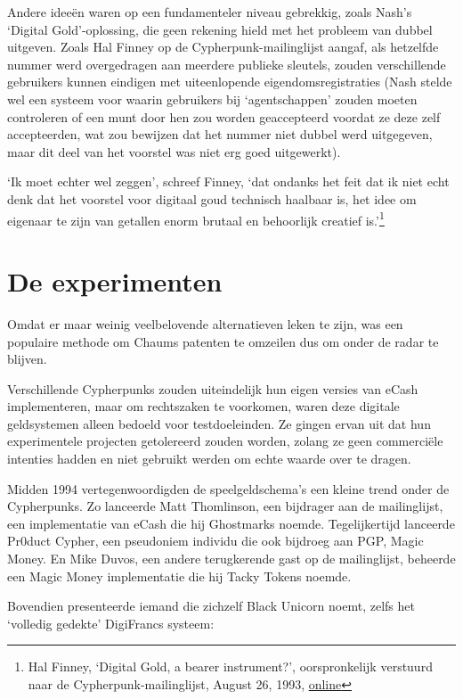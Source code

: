 \documentclass[
  a5paper,
  smalldemyvopaper,11pt,twoside,onecolumn,openright,extrafontsizes,
hidelinks]{memoir}
\begin{document}
Andere ideeën waren op een fundamenteler niveau gebrekkig, zoals Nash's
`Digital Gold'-oplossing, die geen rekening hield met het probleem van
dubbel uitgeven. Zoals Hal Finney op de Cypherpunk-mailinglijst aangaf,
als hetzelfde nummer werd overgedragen aan meerdere publieke sleutels,
zouden verschillende gebruikers kunnen eindigen met uiteenlopende
eigendomsregistraties (Nash stelde wel een systeem voor waarin
gebruikers bij `agentschappen' zouden moeten controleren of een munt
door hen zou worden geaccepteerd voordat ze deze zelf accepteerden, wat
zou bewijzen dat het nummer niet dubbel werd uitgegeven, maar dit deel
van het voorstel was niet erg goed uitgewerkt).

`Ik moet echter wel zeggen', schreef Finney, `dat ondanks het feit dat
ik niet echt denk dat het voorstel voor digitaal goud technisch haalbaar
is, het idee om eigenaar te zijn van getallen enorm brutaal en
behoorlijk creatief is.'\footnote{Hal Finney, `Digital Gold, a bearer
  instrument?', oorspronkelijk verstuurd naar de
  Cypherpunk-mailinglijst, August 26, 1993,
  \href{https://cypherpunks.venona.com/date/1993/08/msg00788.html}{online}}

\section{De experimenten}\label{de-experimenten}

Omdat er maar weinig veelbelovende alternatieven leken te zijn, was een
populaire methode om Chaums patenten te omzeilen dus om onder de radar
te blijven.

Verschillende Cypherpunks zouden uiteindelijk hun eigen versies van
eCash implementeren, maar om rechtszaken te voorkomen, waren deze
digitale geldsystemen alleen bedoeld voor testdoeleinden. Ze gingen
ervan uit dat hun experimentele projecten getolereerd zouden worden,
zolang ze geen commerciële intenties hadden en niet gebruikt werden om
echte waarde over te dragen.

Midden 1994 vertegenwoordigden de speelgeldschema's een kleine trend
onder de Cypherpunks. Zo lanceerde Matt Thomlinson, een bijdrager aan de
mailinglijst, een implementatie van eCash die hij Ghostmarks noemde.
Tegelijkertijd lanceerde Pr0duct Cypher, een pseudoniem individu die ook
bijdroeg aan PGP, Magic Money. En Mike Duvos, een andere terugkerende
gast op de mailinglijst, beheerde een Magic Money implementatie die hij
Tacky Tokens noemde.

Bovendien presenteerde iemand die zichzelf Black Unicorn noemt, zelfs
het `volledig gedekte' DigiFrancs systeem:
\end{document}
